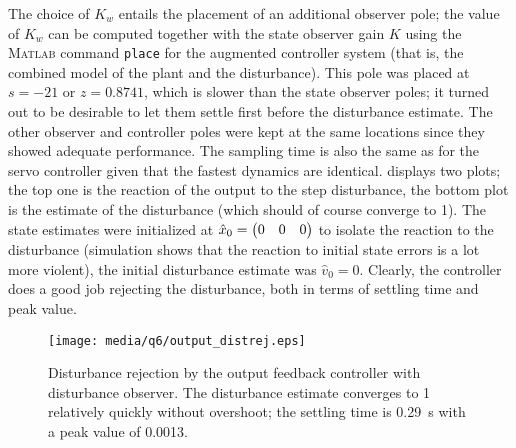 The choice of $K_w$ entails the placement of an additional observer pole; the value of $K_w$ can be computed together with the state observer gain $K$ using the \textsc{Matlab} command \texttt{place} for the augmented controller system (that is, the combined model of the plant and the disturbance). This pole was placed at $s = -21$ or $z = 0.8741$, which is slower than the state observer poles; it turned out to be desirable to let them settle first before the disturbance estimate. The other observer and controller poles were kept at the same locations since they showed adequate performance. The sampling time is also the same as for the servo controller given that the fastest dynamics are identical.
 displays two plots; the top one is the reaction of the output to the step disturbance, the bottom plot is the estimate of the disturbance (which should of course converge to 1). The state estimates were initialized at $\hat{x}_0 = \mqty(0 & 0 & 0)$ to isolate the reaction to the disturbance (simulation shows that the reaction to initial state errors is a lot more violent), the initial disturbance estimate was $\hat{v}_0 = 0$. Clearly, the controller does a good job rejecting the disturbance, both in terms of settling time and peak value.
\begin{figure}[ht!]
    \centering
    \texttt{[image: media/q6/output\_distrej.eps]}
    \caption{Disturbance rejection by the output feedback controller with disturbance observer. The disturbance estimate converges to 1 relatively quickly without overshoot; the settling time is \SI{0.29}{\second} with a peak value of 0.0013.}
    \label{fig:q6_output_distrej}
\end{figure}
\FloatBarrier

